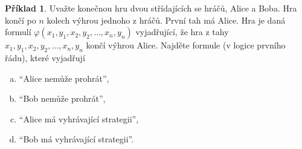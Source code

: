 \documentclass{amsart}
\theoremstyle{definition}
\newtheorem{problem}{Příklad}
\begin{document}
\smallskip
\begin{problem}
Uvažte konečnou hru dvou střídajících se hráčů, Alice a Boba. Hra končí po $n$ kolech výhrou jednoho z hráčů. První tah má Alice. Hra je daná formulí
$\varphi(x_1, y_1, x_2, y_2,\dots,x_n, y_n)$ vyjadřující, že hra z tahy $x_1, y_1, x_2, y_2,\dots,x_n, y_n$ končí výhrou Alice. Najděte formule (v logice prvního řádu), které vyjadřují
\begin{enumerate}[(a)]
    \item ``Alice nemůže prohrát'',
    \item ``Bob nemůže prohrát'',
    \item ``Alice má vyhrávající strategii'',
    \item ``Bob má vyhrávající strategii''.
\end{enumerate}
\end{problem}
\end{document}
